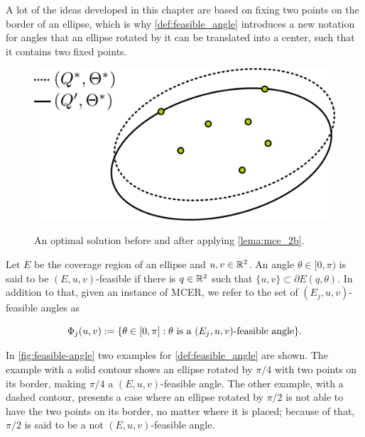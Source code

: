 A lot of the ideas developed in this chapter are based on fixing two points on the border of an ellipse, which is why \autoref{def:feasible_angle} introduces a new notation for angles that an ellipse rotated by it can be translated into a center, such that it contains two fixed points. 

\begin{figure}
	\centering
	\caption{An optimal solution before and after applying \autoref{lema:mce_2b}.}
	\includegraphics[scale=.38]{tex/figures/ellipse-2-points}
	\fautor
	\label{fig:ellipse-2-points}
\end{figure}

\begin{definicao}\label{def:feasible_angle}
	Let $E$ be the coverage region of an ellipse and $u, v \in \mathbb{R}^2$. An angle $\theta \in [0, \pi)$ is said to be $(E, u, v)$-feasible if there is $q \in \mathbb{R}^2$ such that $\{u, v\} \subset \partial E(q, \theta)$.
	In addition to that, given an instance of MCER, we refer to the set of $(E_j, u, v)$-feasible angles as 
	
	\begin{equation}
	\Phi_j(u, v) := \{\theta \in [0, \pi] : \theta \textnormal{ is a } (E_j,u,v)\textnormal{-feasible angle}\}.
	\end{equation}
\end{definicao}

In \autoref{fig:feasible-angle} two examples for \autoref{def:feasible_angle} are shown. The example with a solid contour shows an ellipse rotated by $\pi/4$ with two points on its border, making $\pi/4$ a $(E, u, v)$-feasible angle.
The other example, with a dashed contour, presents a case where an ellipse rotated by $\pi/2$ is not able to have the two points on its border, no matter where it is placed; because of that, $\pi/2$ is said to be a not $(E, u, v)$-feasible angle.

